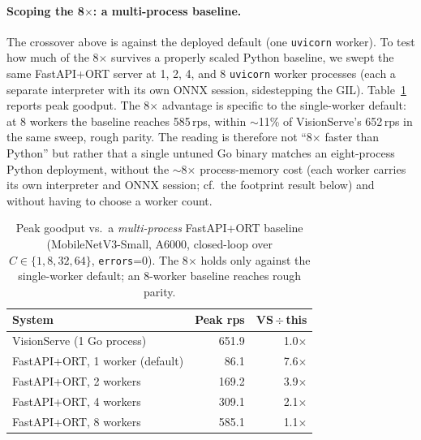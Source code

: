 \paragraph{Scoping the 8$\times$: a multi-process baseline.}
The crossover above is against the deployed default (one \texttt{uvicorn} worker).  To
test how much of the 8$\times$ survives a properly scaled Python baseline, we
swept the same FastAPI+ORT server at 1, 2, 4, and 8 \texttt{uvicorn} worker processes
(each a separate interpreter with its own ONNX session, sidestepping the GIL).
Table~\ref{tab:workers} reports peak goodput.  The 8$\times$ advantage is specific to the
single-worker default: at 8 workers the baseline reaches 585\,rps, within $\sim$11\% of
VisionServe's 652\,rps in the same sweep, rough parity.  The reading is therefore not
``8$\times$ faster than Python'' but rather that a single untuned Go binary matches an
eight-process Python deployment, without the $\sim$8$\times$ process-memory cost (each worker
carries its own interpreter and ONNX session; cf.\ the footprint result below) and without
having to choose a worker count.

\begin{table}[t]
  \centering
  \small
  \setlength{\tabcolsep}{4pt}
  \caption{%
    Peak goodput vs.\ a \emph{multi-process} FastAPI+ORT baseline (MobileNetV3-Small, A6000,
    closed-loop over $C\in\{1,8,32,64\}$, \texttt{errors}=0).  The 8$\times$ holds only against
    the single-worker default; an 8-worker baseline reaches rough parity.%
  }
  \label{tab:workers}
  \begin{tabular}{lrr}
    \toprule
    \textbf{System} & \textbf{Peak rps} & \textbf{VS\,$\div$\,this} \\
    \midrule
    VisionServe (1 Go process)              & 651.9 & 1.0$\times$ \\
    FastAPI+ORT, 1 worker (default)         &  86.1 & 7.6$\times$ \\
    FastAPI+ORT, 2 workers                  & 169.2 & 3.9$\times$ \\
    FastAPI+ORT, 4 workers                  & 309.1 & 2.1$\times$ \\
    FastAPI+ORT, 8 workers                  & 585.1 & 1.1$\times$ \\
    \bottomrule
  \end{tabular}
\end{table}

